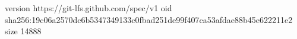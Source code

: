 version https://git-lfs.github.com/spec/v1
oid sha256:19c06a2570dc6b5347349133c0fbad251de99f407ca53afdae88b45e622211e2
size 14888
